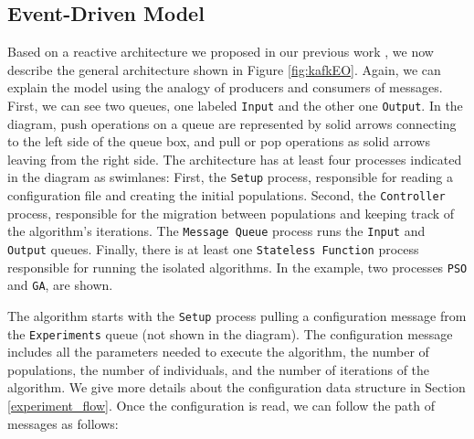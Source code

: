 \documentclass[review]{elsarticle}
\begin{document}
\subsection{Event-Driven Model} 
\label{edm}
Based on a reactive architecture we proposed in our previous work
\cite{guervos2018introducing}, we now describe the general architecture shown in
Figure \ref{fig:kafkEO}. Again, we can explain the model using the analogy
of producers and consumers of messages. First, we can see two queues, 
one labeled \texttt{Input} and the other one \texttt{Output}. In the diagram, 
push operations on a queue are represented by solid arrows connecting to the left side
of the queue box, and pull or pop operations as solid arrows leaving from the right side.
The architecture has at least four processes indicated in the diagram as
swimlanes: First, the \texttt{Setup} process, responsible for reading a configuration
file and creating the initial populations. Second, the \texttt{Controller} process,
responsible for the migration between populations and keeping track of the algorithm's
iterations. The \texttt{Message Queue} process runs the \texttt{Input} and \texttt{Output}
queues. Finally, there is at least one \texttt{Stateless Function} process responsible
for running the isolated algorithms. In the example, two processes \texttt{PSO} and \texttt{GA},
are shown. 

The algorithm starts with the \texttt{Setup} process pulling a configuration message from
the \texttt{Experiments} queue (not shown in the diagram). The configuration message 
includes all the parameters needed to execute the algorithm, the number of populations,
the number of individuals, and the number of iterations 
of the algorithm. We give more details about the configuration data structure
in Section \ref{experiment_flow}. %
Once the configuration is read, we can follow the path of 
messages as follows:
\end{document}
